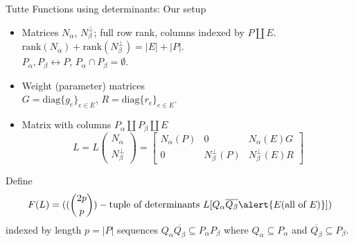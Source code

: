 \documentclass{beamer}
\newcommand{\dunion}{\coprod}
\newcommand{\ext}[1]{\ensuremath{\mathbf{#1}}}
\begin{document}
    
   


\newcommand{\Nal}{\ensuremath{N_{\alpha}}}
\newcommand{\NbePe}{\ensuremath{N_{\beta}^{\perp}}}
\newcommand{\eNal}{\ensuremath{\ext{N}_{\alpha}}}
\newcommand{\eNbePe}{\ensuremath{\ext{N}_{\beta}^{\perp}}}


\begin{frame}{Tutte Functions using determinants: Our setup}
  \begin{itemize}
  \item
    Matrices $\Nal$, $\NbePe$; full row rank, columns indexed by
    $P\dunion E$. $\text{rank}(\Nal)+\text{rank}(\NbePe)=|E|+|P|$.\\
    $P_{\alpha},P_{\beta}\leftrightarrow P$, $P_{\alpha}\cap P_{\beta}=\emptyset$.
  \item
    Weight (parameter) matrices\\
    $G=\text{diag}\{g_e\}_{e\in E} $,
    $R=\text{diag}\{r_e\}_{e\in E} $.
  \item
    Matrix with columns $P_\alpha \dunion P_\beta \dunion E$
    \[
    L = L\left( \begin{array}{c} \Nal\\ \NbePe \end{array} \right)
    = \left[\begin{array}{c|c|c} \Nal(P)  &  0  &  \Nal(E)G \\  \hline
0  & \NbePe(P)  &  \NbePe(E)R \end{array}\right]
    \]
  \end{itemize}

  Define
  \[
  F(L)=((\binom{2p}{p})-\text{tuple of determinants\ } L[Q_\alpha \overline{Q_\beta} \alert{E(\text{all of }E)}])
  \]
  indexed by length $p=|P|$ sequences $Q_\alpha \overline{Q_\beta} \subseteq P_\alpha P_\beta$ where
  $Q_\alpha\subseteq P_\alpha$ and $\overline{Q_\beta}\subseteq P_\beta$.
    
\end{frame}
\end{document}
